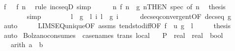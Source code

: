 \begin{isabellebody}
\ {\isachardoublequoteopen}f\ {}\ {\isasymle}\ f\ n{\isachardoublequoteclose}\ \isamarkupfalse%
\ {\isacharparenleft}{\kern0pt}rule\ incseqD{\isacharparenright}{\kern0pt}\ simp\isanewline
\ \ \ \ \isamarkupfalse%
\ {\isacartoucheopen}{\isasymforall}n{\isachardot}{\kern0pt}\ f\ n\ {\isasymle}\ g\ n{\isacartoucheclose}{\isacharbrackleft}{\kern0pt}THEN\ spec{\isacharcomma}{\kern0pt}\ of\ n{\isacharbrackright}{\kern0pt}\ \isamarkupfalse%
\ {\isacharquery}{\kern0pt}thesis\isanewline
\ \ \ \ \ \ \isamarkupfalse%
\ simp\isanewline
\ \ \isamarkupfalse%
\isanewline
\ \ \isamarkupfalse%
\ \isamarkupfalse%
\ l\ \ {\isachardoublequoteopen}g\ {\isasymlonglonglongrightarrow}\ l{\isachardoublequoteclose}\ {\isachardoublequoteopen}{\isasymforall}i{\isachardot}{\kern0pt}\ l\ {\isasymle}\ g\ i{\isachardoublequoteclose}\isanewline
\ \ \ \ \isamarkupfalse%
\ decseq{\isacharunderscore}{\kern0pt}convergent{\isacharbrackleft}{\kern0pt}OF\ {\isacartoucheopen}decseq\ g{\isacartoucheclose}{\isacharbrackright}{\kern0pt}\ \isamarkupfalse%
\ auto\isanewline
\ \ \isamarkupfalse%
\ \isamarkupfalse%
\ LIMSEQ{\isacharunderscore}{\kern0pt}unique{\isacharbrackleft}{\kern0pt}OF\ assms{\isacharparenleft}{\kern0pt}{}{\isacharparenright}{\kern0pt}\ tendsto{\isacharunderscore}{\kern0pt}diff{\isacharbrackleft}{\kern0pt}OF\ {\isacartoucheopen}f\ {\isasymlonglonglongrightarrow}\ u{\isacartoucheclose}\ {\isacartoucheopen}g\ {\isasymlonglonglongrightarrow}\ l{\isacartoucheclose}{\isacharbrackright}{\kern0pt}{\isacharbrackright}{\kern0pt}\isanewline
\ \ \isamarkupfalse%
\ \isamarkupfalse%
\ {\isacharquery}{\kern0pt}thesis\ \isamarkupfalse%
\ auto\isanewline
{}\isamarkupfalse%
%
\endisatagproof
{\isafoldproof}%
%
\isadelimproof
\isanewline
%
\endisadelimproof
\isanewline
{}\isamarkupfalse%
\ Bolzano{\isacharbrackleft}{\kern0pt}consumes\ {}{\isacharcomma}{\kern0pt}\ case{\isacharunderscore}{\kern0pt}names\ trans\ local{\isacharbrackright}{\kern0pt}{\isacharcolon}{\kern0pt}\isanewline
\ \ \ P\ {\isacharcolon}{\kern0pt}{\isacharcolon}{\kern0pt}\ {\isachardoublequoteopen}real\ {\isasymRightarrow}\ real\ {\isasymRightarrow}\ bool{\isachardoublequoteclose}\isanewline
\ \ \ {\isacharbrackleft}{\kern0pt}arith{\isacharbrackright}{\kern0pt}{\isacharcolon}{\kern0pt}\ {\isachardoublequoteopen}a\ {\isasymle}\ b{\isachardoublequoteclose}\isanewline

\end{isabellebody}

